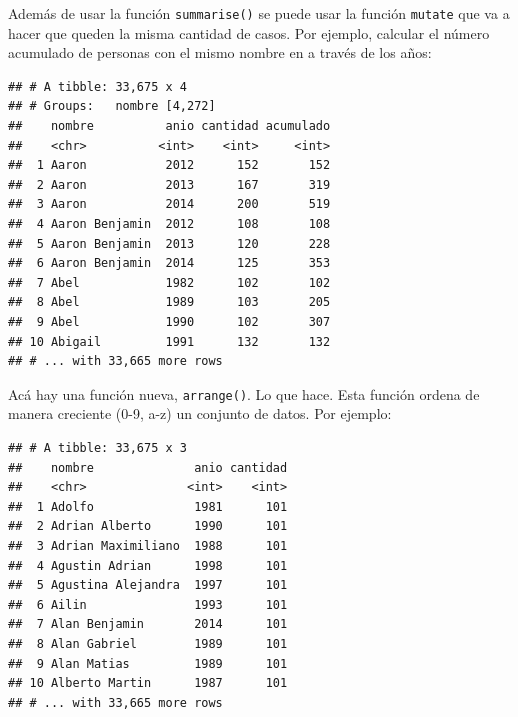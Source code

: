 \documentclass[]{book}
\newenvironment{Shaded}{\begin{snugshade}}{\end{snugshade}}
\newcommand{\DataTypeTok}[1]{\textcolor[rgb]{0.13,0.29,0.53}{#1}}
\newcommand{\KeywordTok}[1]{\textcolor[rgb]{0.13,0.29,0.53}{\textbf{#1}}}
\newcommand{\NormalTok}[1]{#1}
\newcommand{\OperatorTok}[1]{\textcolor[rgb]{0.81,0.36,0.00}{\textbf{#1}}}
\newcommand{\OtherTok}[1]{\textcolor[rgb]{0.56,0.35,0.01}{#1}}
\newcommand{\StringTok}[1]{\textcolor[rgb]{0.31,0.60,0.02}{#1}}
\theoremstyle{definition}
\theoremstyle{definition}
\theoremstyle{definition}
\theoremstyle{remark}
\begin{document}
Además de usar la función \texttt{summarise()} se puede usar la función
\texttt{mutate} que va a hacer que queden la misma cantidad de casos.
Por ejemplo, calcular el número acumulado de personas con el mismo
nombre en a través de los años:

\begin{Shaded}
\end{Shaded}

\begin{verbatim}
## # A tibble: 33,675 x 4
## # Groups:   nombre [4,272]
##    nombre          anio cantidad acumulado
##    <chr>          <int>    <int>     <int>
##  1 Aaron           2012      152       152
##  2 Aaron           2013      167       319
##  3 Aaron           2014      200       519
##  4 Aaron Benjamin  2012      108       108
##  5 Aaron Benjamin  2013      120       228
##  6 Aaron Benjamin  2014      125       353
##  7 Abel            1982      102       102
##  8 Abel            1989      103       205
##  9 Abel            1990      102       307
## 10 Abigail         1991      132       132
## # ... with 33,665 more rows
\end{verbatim}

Acá hay una función nueva, \texttt{arrange()}. Lo que hace. Esta función
ordena de manera creciente (0-9, a-z) un conjunto de datos. Por ejemplo:

\begin{Shaded}
\end{Shaded}

\begin{verbatim}
## # A tibble: 33,675 x 3
##    nombre              anio cantidad
##    <chr>              <int>    <int>
##  1 Adolfo              1981      101
##  2 Adrian Alberto      1990      101
##  3 Adrian Maximiliano  1988      101
##  4 Agustin Adrian      1998      101
##  5 Agustina Alejandra  1997      101
##  6 Ailin               1993      101
##  7 Alan Benjamin       2014      101
##  8 Alan Gabriel        1989      101
##  9 Alan Matias         1989      101
## 10 Alberto Martin      1987      101
## # ... with 33,665 more rows
\end{verbatim}
\end{document}
